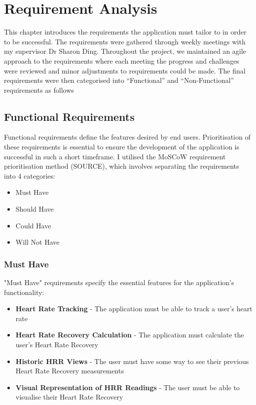 \documentclass{l4proj}
\begin{document}
\chapter{Requirement Analysis}

This chapter introduces the requirements the application must tailor to in order to be successful. The requirements were gathered through weekly meetings with my supervisor Dr Sharon Ding. Throughout the project, we maintained an agile approach to the requirements where each meeting the progress and challenges were reviewed and minor adjustments to requirements could be made. The final requirements were then categorised into “Functional” and “Non-Functional” requirements as follows

\section{Functional Requirements}

Functional requirements define the features desired by end users. Prioritisation of these requirements is essential to ensure the development of the application is successful in such a short timeframe. I utilised the MoSCoW requirement prioritisation method (SOURCE), which involves separating the requirements into 4 categories:

\begin{itemize}
    \item Must Have 
    \item Should Have
    \item Could Have
    \item Will Not Have
\end{itemize}

\subsection{Must Have}

"Must Have" requirements specify the essential features for the application's functionality:

\begin{itemize}
    \item \textbf{Heart Rate Tracking} - The application must be able to track a user's heart rate
    \item \textbf{Heart Rate Recovery Calculation} - The application must calculate the user's Heart Rate Recovery
    \item \textbf{Historic HRR Views} - The user must have some way to see their previous Heart Rate Recovery measurements
    \item \textbf{Visual Representation of HRR Readings} - The user must be able to visualise their Heart Rate Recovery
\end{itemize}
\end{document}
